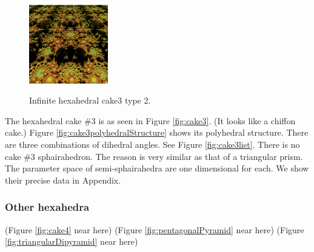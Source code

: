 \documentclass[suppldata, dvipdfmx]{interact}
\theoremstyle{plain}%
\theoremstyle{definition}
\theoremstyle{remark}
\theoremstyle{problemstyle}
\begin{document}
\begin{figure}[h!tbp]
\begin{minipage}{0.5\textwidth}
\begin{minipage}[t]{0.24\textwidth}
  \end{minipage}
  \hspace*{\fill}
  \begin{minipage}[t]{0.24\textwidth}
   \centering
   \includegraphics[width=1.35in, height=1.35in,
   keepaspectratio]{./img/sphairahedron/hexahedralCake3/limitsetInf_b.jpg} 
   \label{fig:cake3infiniteLimitsetType2}
  \end{minipage}
  \hspace*{\fill}
  \caption{Infinite hexahedral cake3 type 2.}
  \label{fig:cake3infiniteType2}
 \end{minipage}
\end{figure}

The hexahedral cake \#3 is as seen in Figure \ref{fig:cake3}.  
(It looks like a chiffon cake.)
Figure \ref{fig:cake3polyhedralStructure} shows its polyhedral structure.  
There are three combinations of dihedral angles.  See Figure \ref{fig:cake3list}.
There is no cake \#3 sphairahedron.  The reason is very similar as that of a triangular prism.  The parameter space of semi-sphairahedra are one dimensional for each.  We show their precise data in Appendix.



\subsubsection{Other hexahedra}

\noindent(Figure \ref{fig:cake4} near here)
(Figure \ref{fig:pentagonalPyramid} near here)
(Figure \ref{fig:triangularDipyramid} near here)
\end{document}
